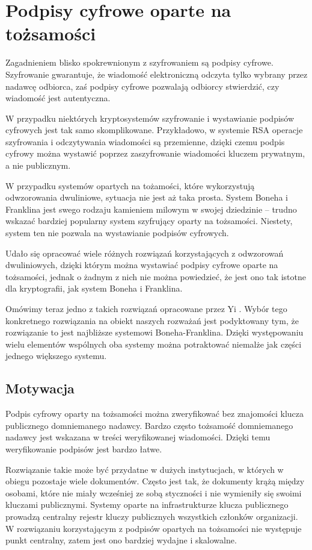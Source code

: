\section{Podpisy cyfrowe oparte na tożsamości}

\noindent
Zagadnieniem blisko spokrewnionym z szyfrowaniem są podpisy cyfrowe.
Szyfrowanie gwarantuje,
że wiadomość elektroniczną odczyta tylko wybrany przez nadawcę odbiorca,
zaś podpisy cyfrowe pozwalają odbiorcy stwierdzić,
czy wiadomość jest autentyczna.

\noindent
W przypadku niektórych kryptosystemów
szyfrowanie i wystawianie podpisów cyfrowych jest tak samo skomplikowane.
Przykładowo,
w systemie RSA operacje szyfrowania i odczytywania wiadomości są przemienne,
dzięki czemu podpis cyfrowy można wystawić
poprzez zaszyfrowanie wiadomości kluczem prywatnym, a nie publicznym.

\noindent
W przypadku systemów opartych na tożamości,
które wykorzystują odwzorowania dwuliniowe,
sytuacja nie jest aż taka prosta.
System Boneha i Franklina jest swego rodzaju kamieniem milowym
w swojej dziedzinie --
trudno wskazać bardziej popularny system szyfrujący oparty na tożsamości.
Niestety, system ten nie pozwala na wystawianie podpisów cyfrowych.

\noindent
Udało się opracować wiele różnych rozwiązań
korzystających z odwzorowań dwuliniowych,
dzięki którym można wystawiać podpisy cyfrowe oparte na tożsamości,
jednak o żadnym z nich nie można powiedzieć,
że jest ono tak istotne dla kryptografii,
jak system Boneha i Franklina.

\noindent
Omówimy teraz jedno z takich rozwiązań
opracowane przez Yi \cite{yi}.
Wybór tego konkretnego rozwiązania na obiekt naszych rozważań
jest podyktowany tym,
że rozwiązanie to jest najbliższe systemowi Boneha-Franklina.
Dzięki występowaniu wielu elementów wspólnych
oba systemy można potraktować niemalże jak części jednego większego systemu.

\subsection*{Motywacja}

\noindent
Podpis cyfrowy oparty na tożsamości można zweryfikować
bez znajomości klucza publicznego domniemanego nadawcy.
Bardzo często tożsamość domniemanego nadawcy
jest wskazana w treści weryfikowanej wiadomości.
Dzięki temu weryfikowanie podpisów jest bardzo łatwe.

\noindent
Rozwiązanie takie może być przydatne w dużych instytucjach,
w których w obiegu pozostaje wiele dokumentów.
Często jest tak, że dokumenty krążą między osobami,
które nie miały wcześniej ze sobą styczności
i nie wymieniły się swoimi kluczami publicznymi.
Systemy oparte na infrastrukturze klucza publicznego
prowadzą centralny rejestr kluczy publicznych
wszystkich członków organizacji.
W rozwiązaniu korzystającym z podpisów opartych na tożsamości
nie występuje punkt centralny,
zatem jest ono bardziej wydajne i skalowalne.

